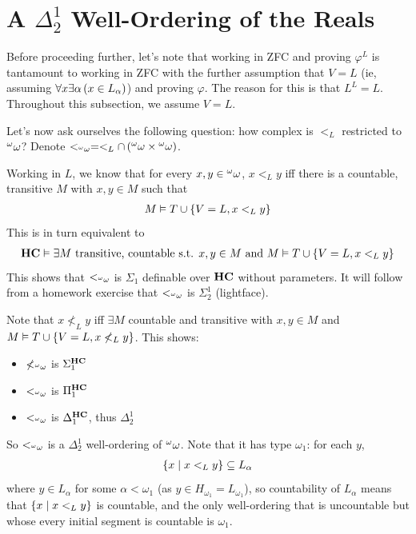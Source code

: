 \section{A $\Delta^1_2$ Well-Ordering of the Reals}

Before proceeding further, let's note that working in ZFC and proving $\varphi^L$ is tantamount to working in ZFC with the further assumption that $V = L$ (ie, assuming $\forall x \exists \alpha \left( x \in L_{\alpha} \right)$) and proving $\varphi$. The reason for this is that $L^L = L$. Throughout this subsection, we assume $V = L$.

Let's now ask ourselves the following question: how complex is $<_L$ restricted to ${^{\omega}\omega}$? Denote $<_{{^{\omega}\omega}} = <_L \cap \left( {^{\omega}\omega} \times {^{\omega}\omega} \right)$.

Working in $L$, we know that for every $x, y \in {^{\omega}\omega}$, $x <_L y$ iff there is a countable, transitive $M$ with $x, y \in M$ such that
\begin{align*}
    M \vDash T \cup \left\{ V = L, x <_L y \right\}
\end{align*}
This is in turn equivalent to
\begin{align*}
    \mathbf{HC} \vDash \exists M \text{ transitive, countable} \text{ s.t. } x, y \in M \text{ and } M \vDash T \cup \left\{ V = L, x <_L y \right\}
\end{align*}
This shows that $<_{{^{\omega}\omega}}$ is $\Sigma_1$ definable over $\mathbf{HC}$ without parameters. It will follow from a homework exercise that $<_{{^{\omega}\omega}}$ is $\Sigma_2^1$ (lightface).

Note that $x \not<_{L} y$ iff $\exists M$ countable and transitive with $x, y \in M$ and $M \vDash T \cup \left\{ V = L, x \not<_L y \right\}$. This shows:
\begin{itemize}
    \item $\not<_{{^{\omega}\omega}}$ is $\Sigma_1^{\mathbf{HC}}$
    \item $<_{{^{\omega}\omega}}$ is $\Pi_1^{\mathbf{HC}}$
    \item $<_{{^{\omega}\omega}}$ is $\Delta_1^{\mathbf{HC}}$, thus $\Delta^1_2$
\end{itemize}

So $<_{{^{\omega}\omega}}$ is a $\Delta^1_2$ well-ordering of ${^{\omega}\omega}$. Note that it has type $\omega_1$: for each $y$,
\begin{align*}
    \left\{ x \; \middle\vert \; x <_L y \right\} \subseteq L_{\alpha}
\end{align*}
where $y \in L_{\alpha}$ for some $\alpha < \omega_1$ (as $y \in H_{\omega_1} = L_{\omega_1}$), so countability of $L_{\alpha}$ means that $\left\{ x \; \middle\vert \; x <_L y \right\}$ is countable, and the only well-ordering that is uncountable but whose every initial segment is countable is $\omega_1$.

